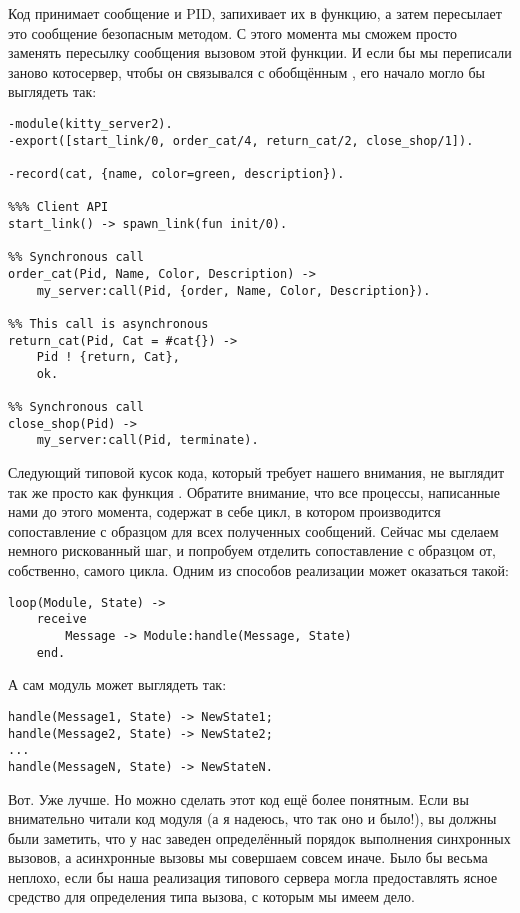 Код принимает сообщение и PID, запихивает их в функцию, а затем пересылает это сообщение безопасным методом.
С этого момента мы сможем просто заменять пересылку сообщения вызовом этой функции.
И если бы мы переписали заново котосервер, чтобы он связывался с обобщённым , его начало могло бы выглядеть так:
\begin{lstlisting}[style=erlang]
-module(kitty_server2).
-export([start_link/0, order_cat/4, return_cat/2, close_shop/1]).
 
-record(cat, {name, color=green, description}).
 
%%% Client API
start_link() -> spawn_link(fun init/0).
 
%% Synchronous call
order_cat(Pid, Name, Color, Description) ->
    my_server:call(Pid, {order, Name, Color, Description}).
 
%% This call is asynchronous
return_cat(Pid, Cat = #cat{}) ->
    Pid ! {return, Cat},
    ok.
 
%% Synchronous call
close_shop(Pid) ->
    my_server:call(Pid, terminate).
\end{lstlisting}
Следующий типовой кусок кода, который требует нашего внимания, не выглядит так же просто как функция .
Обратите внимание, что все процессы, написанные нами до этого момента, содержат в себе цикл, в котором производится сопоставление с образцом для всех полученных сообщений.
Сейчас мы сделаем немного рискованный шаг, и попробуем отделить сопоставление с образцом от, собственно, самого цикла.
Одним из способов реализации может оказаться такой:
\begin{lstlisting}[style=erlang]
loop(Module, State) ->
    receive
        Message -> Module:handle(Message, State)
    end.
\end{lstlisting}

А сам модуль может выглядеть так:
\begin{lstlisting}[style=erlang]
handle(Message1, State) -> NewState1;
handle(Message2, State) -> NewState2;
...
handle(MessageN, State) -> NewStateN.
\end{lstlisting}
Вот.
Уже лучше.
Но можно сделать этот код ещё более понятным.
Если вы внимательно читали код модуля  (а я надеюсь, что так оно и было!), вы должны были заметить, что у нас заведен определённый порядок выполнения синхронных вызовов, а асинхронные вызовы мы совершаем совсем иначе.
Было бы весьма неплохо, если бы наша реализация типового сервера могла предоставлять ясное средство для определения типа вызова, с которым мы имеем дело.

